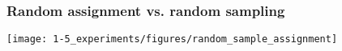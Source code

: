 



\begin{frame}
\frametitle{Random assignment vs. random sampling}

\begin{center}
\texttt{[image: 1-5\_experiments/figures/random\_sample\_assignment]}
\end{center}

\end{frame}

